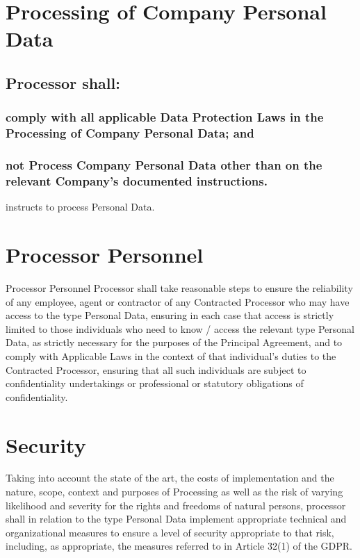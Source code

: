 \documentclass[a4paper]{article}
\begin{document}
\section{Processing of Company Personal Data}

\subsection{Processor shall:}

\subsubsection{comply with all applicable Data Protection Laws in the Processing of Company Personal Data; and}

\subsubsection{not Process Company Personal Data other than on the relevant Company's documented instructions.}

 instructs  to process  Personal Data.

\section{Processor Personnel}

Processor Personnel Processor shall take reasonable steps to ensure the reliability of any employee, agent or contractor of any Contracted Processor who may have access to the \gls{type} Personal Data, ensuring in each case that access is strictly limited to those individuals who need to know / access the relevant \gls{type} Personal Data, as strictly necessary for the purposes of the Principal Agreement, and to comply with Applicable Laws in the context of that individual's duties to the Contracted Processor, ensuring that all such individuals are subject to confidentiality undertakings or professional or statutory obligations of confidentiality.

\section{Security}

Taking into account the state of the art, the costs of implementation and the nature, scope, context and purposes of Processing as well as the risk of varying likelihood and severity for the rights and freedoms of natural persons, \gls{processor} shall in relation to the \gls{type} Personal Data implement appropriate technical and organizational measures to ensure a level of security appropriate to that risk, including, as appropriate, the measures referred to in Article 32(1) of the GDPR.
\end{document}
